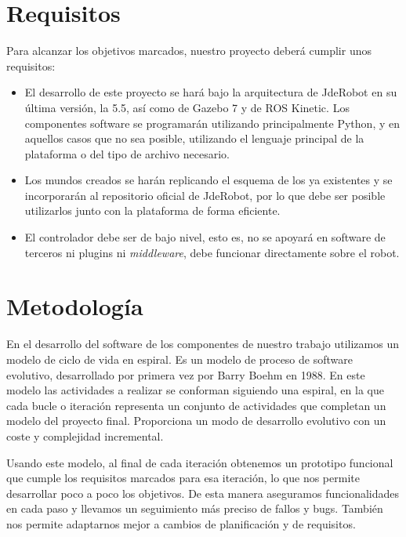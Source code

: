 \section{Requisitos}
\label{sec:obj_requisitos}
 Para alcanzar los objetivos marcados, nuestro proyecto deberá cumplir unos requisitos:
\begin{itemize}
	\item El desarrollo de este proyecto se hará bajo la arquitectura de JdeRobot en su última versión, la 5.5, así como de Gazebo 7 y de ROS Kinetic. Los componentes software se programarán utilizando principalmente Python, y en aquellos casos que no sea posible, utilizando el lenguaje principal de la plataforma o del tipo de archivo necesario.
	
	\item Los mundos creados se harán replicando el esquema de los ya existentes y se incorporarán al repositorio oficial de JdeRobot, por lo que debe ser posible utilizarlos junto con la plataforma de forma eficiente.
	
	\item El controlador debe ser de bajo nivel, esto es, no se apoyará en software de terceros ni plugins ni \textit{middleware}, debe funcionar directamente sobre el robot.
\end{itemize}



\section{Metodología}
\label{sec:obj_metodologia}


En el desarrollo del software de los componentes de nuestro trabajo utilizamos un  modelo de ciclo de vida en espiral. Es un modelo de proceso de software evolutivo, desarrollado por primera vez por Barry Boehm en 1988. En este modelo las actividades a realizar se conforman siguiendo una espiral, en la que cada bucle o iteración representa un conjunto de actividades que completan un modelo del proyecto final. Proporciona un modo de desarrollo evolutivo con un coste y complejidad incremental. 

Usando este modelo, al final de cada iteración obtenemos un prototipo funcional que cumple los requisitos marcados para esa iteración, lo que nos permite desarrollar poco a poco los objetivos. De esta manera aseguramos funcionalidades en cada paso y llevamos un seguimiento más preciso de fallos y bugs. También nos permite adaptarnos mejor a cambios de planificación y de requisitos.

